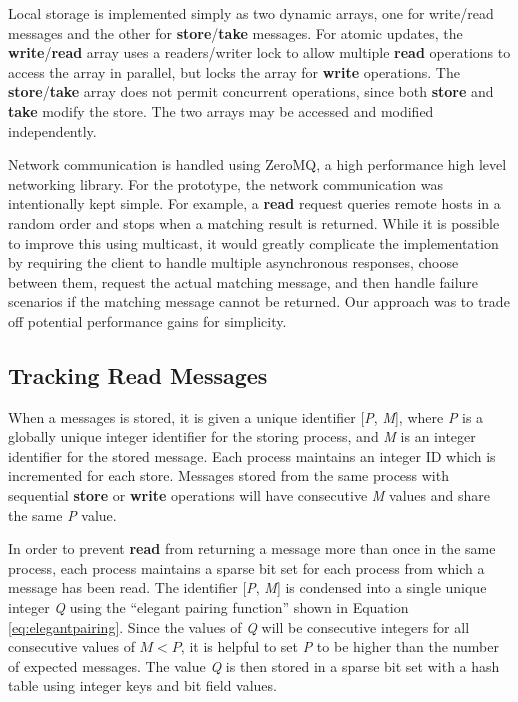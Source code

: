 \documentclass[lnicst]{svmultln}
\begin{document}
Local storage is implemented simply as two dynamic arrays, one for write/read messages and the other for \textbf{store}/\textbf{take} messages. For atomic updates, the \textbf{write}/\textbf{read} array uses a readers/writer lock to allow multiple \textbf{read} operations to access the array in parallel, but locks the array for \textbf{write} operations. The \textbf{store}/\textbf{take} array does not permit concurrent operations, since both \textbf{store} and \textbf{take} modify the store. The two arrays may be accessed and modified independently.

Network communication is handled using ZeroMQ\cite{hintjens2013zeromq}, a high performance high level networking library. For the prototype, the network communication was intentionally kept simple. For example, a \textbf{read} request queries remote hosts in a random order and stops when a matching result is returned. While it is possible to improve this using multicast, it would greatly complicate the implementation by requiring the client to handle multiple asynchronous responses, choose between them, request the actual matching message, and then handle failure scenarios if the matching message cannot be returned. Our approach was to trade off potential performance gains for simplicity. 

\subsection{Tracking Read Messages}\label{sec:readmessages}

    When a messages is stored, it is given a unique identifier [\textit{P}, \textit{M}], where \textit{P} is a globally unique integer identifier for the storing process, and \textit{M} is an integer identifier for the stored message. Each process maintains an integer ID which is incremented for each store. Messages stored from the same process with sequential \textbf{store} or \textbf{write} operations will have consecutive \textit{M} values and share the same \textit{P} value.

    In order to prevent \textbf{read} from returning a message more than once in the same process, each process maintains a sparse bit set for each process from which a message has been read. The identifier [\textit{P}, \textit{M}] is condensed into a single unique integer \textit{Q} using the ``elegant pairing function''\cite{szudzikelegant} shown in Equation \ref{eq:elegantpairing}. Since the values of \textit{Q} will be consecutive integers for all consecutive values of $M < P$, it is helpful to set \textit{P} to be higher than the number of expected messages. The value \textit{Q} is then stored in a sparse bit set with a hash table using integer keys and bit field values.
\end{document}
